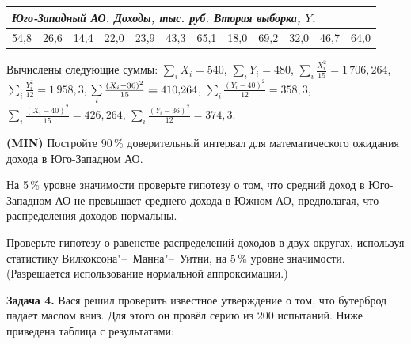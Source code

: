 \documentclass[12pt, a4paper]{article}\usepackage[]{graphicx}\usepackage[]{color}
\newenvironment{enumerate*}{
	\begin{enumerate}
		\setlength{\itemsep}{0pt}
		\setlength{\parskip}{0pt}
		\setlength{\parsep}{0pt}
	}{\end{enumerate}}
\newcommand{\MIN}{\textbf{(MIN)}{}}
\begin{document}
	\begin{tabular}{|p{6mm}|p{6mm}|p{6mm}|p{6mm}|p{6mm}|p{6mm}|p{6mm}|p{6mm}|p{6mm}|p{6mm}|p{6mm}|p{6mm}|}
		\multicolumn{12}{l}{\emph{Юго-Западный АО. Доходы, тыс. руб. Вторая выборка, $Y$.}}\\ \hline
		54{,}8 & 26{,}6 & 14{,}4 & 22{,}0 & 23{,}9 & 43{,}3 & 65{,}1 & 18{,}0 & 69{,}2 & 32{,}0 & 46{,}7 & 64{,}0 \\ \hline
	\end{tabular}\par\smallskip

	Вычислены следующие суммы: $\sum\limits_i X_i=540$, $\sum\limits_i Y_i=480$, $\sum\limits_i \frac{X_i^2}{15}=1\,706{,}264$, $\sum\limits_i \frac{Y_i^2}{12}=1\,958{,}3$, $\sum\limits_i \frac{(X_i-36)^2}{15}\hm=410{,}264$, $\sum\limits_i \frac{(Y_i-40)^2}{12}=358{,}3$, $\sum\limits_i \frac{(X_i-40)^2}{15}=426{,}264$, $\sum\limits_i \frac{(Y_i-36)^2}{12}=374{,}3$.
	\begin{enumerate*}
		\item \MIN{} Постройте 90\,\% доверительный интервал для математического ожидания дохода в Юго-Западном АО.
		\item На 5\,\% уровне значимости проверьте гипотезу о том, что средний доход в Юго-Западном АО не превышает среднего дохода в Южном АО, предполагая, что распределения доходов нормальны.
		\item Проверьте гипотезу о равенстве распределений доходов в двух округах, используя статистику Вилкоксона"--~Манна"--~Уитни, на 5\,\% уровне значимости. (Разрешается использование нормальной аппроксимации.)
	\end{enumerate*}

	\textbf{Задача 4.} Вася решил проверить известное утверждение о том, что бутерброд падает маслом вниз. Для этого он провёл серию из 200 испытаний. Ниже приведена таблица с результатами:
\end{document}
